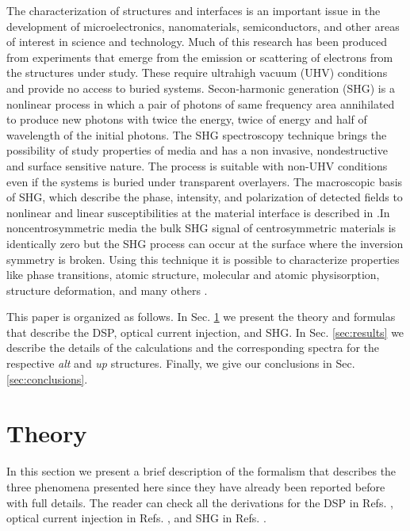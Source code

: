 \documentclass[pss]{wiley2sp} %
\begin{document}
The characterization of structures and interfaces is an important issue in the development of microelectronics, nanomaterials, semiconductors, and other areas of interest in science and technology. Much of this research has been produced from experiments that emerge from the emission or scattering of electrons from the structures under study. These require ultrahigh vacuum (UHV) conditions and provide no access to buried systems. Secon-harmonic generation (SHG) is a nonlinear process in which a pair of photons of same frequency area annihilated to produce new photons with twice the energy, twice of energy and half of wavelength of the initial photons. The SHG spectroscopy technique brings the possibility of study properties of media and has a non invasive, nondestructive and surface sensitive nature. The process is suitable with non-UHV conditions even if the systems is buried under transparent overlayers. The macroscopic basis of SHG, which describe the phase, intensity, and polarization of detected fields to nonlinear and linear susceptibilities at the material interface is described in \cite{downerSIA01}.In noncentrosymmetric media the bulk SHG signal of centrosymmetric materials is identically zero but the SHG process can occur at the surface where the inversion symmetry is broken. Using this technique it is possible to characterize properties like phase transitions, atomic structure, molecular and atomic physisorption, structure deformation, and many others \cite{dadapPRB97,godefroyAPL96,salazarPRB14,mendozaPRL98}. 

This paper is organized as follows. In Sec. \ref{sec:theory} we present the theory and formulas that describe the DSP, optical current injection, and SHG. In Sec. \ref{sec:results} we describe the details of the calculations and the corresponding spectra for the respective \emph{alt} and \emph{up} structures. Finally, we give our conclusions in Sec. \ref{sec:conclusions}.


\section{Theory}\label{sec:theory}

In this section we present a brief description of the formalism that describes the three phenomena presented here since they have already been reported before with full details. The reader can check all the derivations for the DSP in Refs. \cite{nastosPRB07,mendozaPRB12}, optical current injection in Refs. \cite{cabellosPRB11,sipePRB00}, and SHG in Refs. \cite{nastosPRB05,andersonPRB15}.
\end{document}

